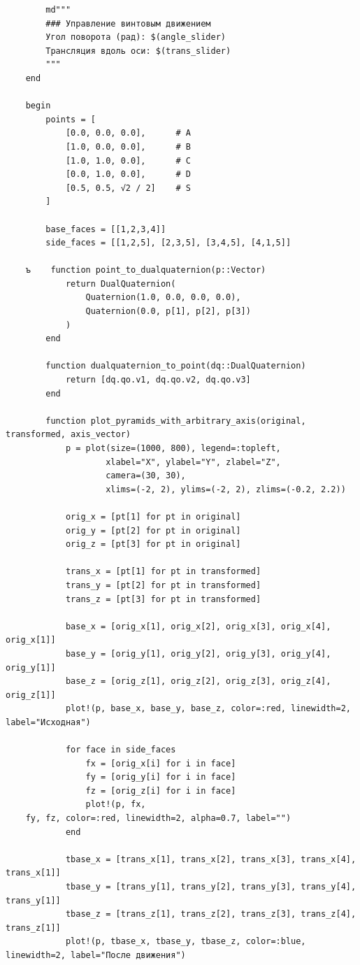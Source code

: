 \begin{verbatim}
        md"""
        ### Управление винтовым движением
        Угол поворота (рад): $(angle_slider)
        Трансляция вдоль оси: $(trans_slider)
        """
    end

    begin
        points = [
            [0.0, 0.0, 0.0],      # A
            [1.0, 0.0, 0.0],      # B
            [1.0, 1.0, 0.0],      # C
            [0.0, 1.0, 0.0],      # D
            [0.5, 0.5, √2 / 2]    # S
        ]

        base_faces = [[1,2,3,4]]
        side_faces = [[1,2,5], [2,3,5], [3,4,5], [4,1,5]]

    ъ    function point_to_dualquaternion(p::Vector)
            return DualQuaternion(
                Quaternion(1.0, 0.0, 0.0, 0.0),
                Quaternion(0.0, p[1], p[2], p[3])
            )
        end

        function dualquaternion_to_point(dq::DualQuaternion)
            return [dq.qo.v1, dq.qo.v2, dq.qo.v3]
        end

        function plot_pyramids_with_arbitrary_axis(original, transformed, axis_vector)
            p = plot(size=(1000, 800), legend=:topleft,
                    xlabel="X", ylabel="Y", zlabel="Z",
                    camera=(30, 30),
                    xlims=(-2, 2), ylims=(-2, 2), zlims=(-0.2, 2.2))

            orig_x = [pt[1] for pt in original]
            orig_y = [pt[2] for pt in original]
            orig_z = [pt[3] for pt in original]

            trans_x = [pt[1] for pt in transformed]
            trans_y = [pt[2] for pt in transformed]
            trans_z = [pt[3] for pt in transformed]

            base_x = [orig_x[1], orig_x[2], orig_x[3], orig_x[4], orig_x[1]]
            base_y = [orig_y[1], orig_y[2], orig_y[3], orig_y[4], orig_y[1]]
            base_z = [orig_z[1], orig_z[2], orig_z[3], orig_z[4], orig_z[1]]
            plot!(p, base_x, base_y, base_z, color=:red, linewidth=2, label="Исходная")

            for face in side_faces
                fx = [orig_x[i] for i in face]
                fy = [orig_y[i] for i in face]
                fz = [orig_z[i] for i in face]
                plot!(p, fx,
    fy, fz, color=:red, linewidth=2, alpha=0.7, label="")
            end

            tbase_x = [trans_x[1], trans_x[2], trans_x[3], trans_x[4], trans_x[1]]
            tbase_y = [trans_y[1], trans_y[2], trans_y[3], trans_y[4], trans_y[1]]
            tbase_z = [trans_z[1], trans_z[2], trans_z[3], trans_z[4], trans_z[1]]
            plot!(p, tbase_x, tbase_y, tbase_z, color=:blue, linewidth=2, label="После движения")


\end{verbatim}
